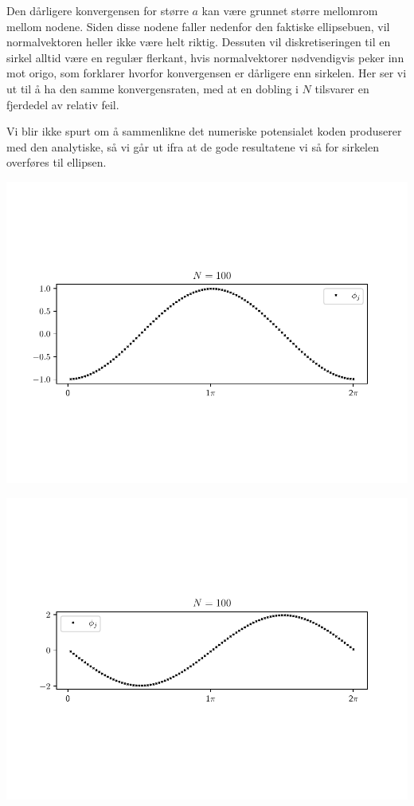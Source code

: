 \noindent Den dårligere konvergensen for større $a$ kan være grunnet større mellomrom mellom nodene.
Siden disse nodene faller nedenfor den faktiske ellipsebuen, vil normalvektoren heller ikke være helt riktig.
Dessuten vil diskretiseringen til en sirkel alltid være en regulær flerkant, hvis normalvektorer nødvendigvis peker inn mot origo, som forklarer hvorfor konvergensen er dårligere enn sirkelen.
Her ser vi ut til å ha den samme konvergensraten, med at en dobling i $N$ tilsvarer en fjerdedel av relativ feil.

Vi blir ikke spurt om å sammenlikne det numeriske potensialet koden produserer med den analytiske, så vi går ut ifra at de gode resultatene vi så for sirkelen overføres til ellipsen.
\begin{Figure}
    \centering
    \captionsetup{type = figure}
    \includegraphics[width = \textwidth]{phi1_a2_b1_N100.pdf}
    \label{fig:phi1_a2_b1_N100}
\end{Figure}
\begin{Figure}
    \centering
    \captionsetup{type = figure}
    \includegraphics[width = \textwidth]{phi2_a2_b1_N100.pdf}
    \label{fig:phi2_a2_b1_N100}
\end{Figure}
